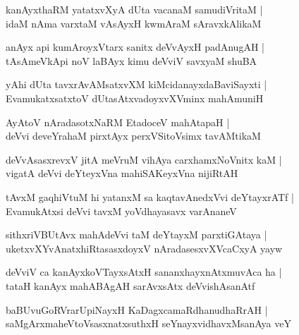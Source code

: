 \begin{shloka}
kanAyxthaRM yatatxvXyA dUta vacanaM samudiVritaM |\\
idaM nAma varxtaM vAsAyxH kwmAraM sAravxkAlikaM 
\end{shloka}

\begin{shloka}
anAyx api kumAroyxVtarx sanitx deVvAyxH padAnugAH |\\
tAsAmeVkApi noV laBAyx kimu deVviV savxyaM shuBA
\end{shloka}

\begin{shloka}
yAhi dUta tavxrAvAMsatxvXM kiMcidanayxdaBaviSayxti |\\
EvamukatxsatxtoV dUtasAtxvadoyxvXVminx mahAmuniH 
\end{shloka}

\begin{shloka}
AyAtoV nAradasotxNaRM EtadoceV mahAtapaH |\\
deVvi deveYrahaM pirxtAyx perxVSitoVsimx tavAMtikaM 
\end{shloka}

\begin{shloka}
deVvAsasxrevxV jitA meVruM vihAya carxhamxNoVnitx kaM |\\
vigatA deVvi deYteyxVna mahiSAKeyxVna nijiRtAH 
\end{shloka}

\begin{shloka}
tAvxM gaqhiVtuM hi yatanxM sa kaqtavAnedxVvi deYtayxrATf |\\
EvamukAtxsi deVvi tavxM yoVdhayasavx varAnaneV 
\end{shloka}

\begin{shloka}
sithxriVBUtAvx mahAdeVvi taM deYtayxM parxtiGAtaya |\\
uketxvXYvAnatxhiRtasasxdoyxV nAradasesxvXVcaCxyA yayw 
\end{shloka}

\begin{shloka}
deVviV ca kanAyxkoVTayxsAtxH sananxhayxnAtxmuvAca ha |\\
tataH kanAyx mahABAgAH sarAvxsAtx deVvishAsanAtf 
\end{shloka}

\begin{shloka}
baBUvuGoRVrarUpiNayxH KaDagxcamaRdhanudhaRrAH |\\
saMgArxmaheVtoVsasxnatxsuthxH seYnayxvidhavxMsanAya veY 
\end{shloka}

